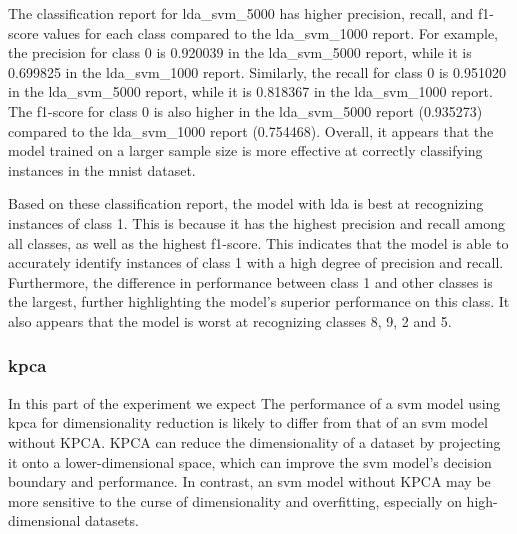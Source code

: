 The classification report for lda_svm_5000 has higher precision, recall, and f1-score values for each class compared to the lda_svm_1000 report. For example, the precision for class 0 is 0.920039 in the lda_svm_5000 report, while it is 0.699825 in the lda_svm_1000 report. Similarly, the recall for class 0 is 0.951020 in the lda_svm_5000 report, while it is 0.818367 in the lda_svm_1000 report. The f1-score for class 0 is also higher in the lda_svm_5000 report (0.935273) compared to the lda_svm_1000 report (0.754468). Overall, it appears that the model trained on a larger sample size is more effective at correctly classifying instances in the \gls{mnist} dataset.

Based on these classification report, the model with \gls{lda} is best at recognizing instances of class 1. This is because it has the highest precision and recall among all classes, as well as the highest f1-score. This indicates that the model is able to accurately identify instances of class 1 with a high degree of precision and recall. Furthermore, the difference in performance between class 1 and other classes is the largest, further highlighting the model's superior performance on this class. It also appears that the model is worst at recognizing classes 8, 9, 2 and 5.

\subsubsection{\gls{kpca}}\label{subsubsec:experiment_4_kernel_pca}
In this part of the experiment we expect The performance of a \gls{svm} model using  \gls{kpca} for dimensionality reduction is likely to differ from that of an \gls{svm} model without KPCA. KPCA can reduce the dimensionality of a dataset by projecting it onto a lower-dimensional space, which can improve the \gls{svm} model's decision boundary and performance. In contrast, an \gls{svm} model without KPCA may be more sensitive to the curse of dimensionality and overfitting, especially on high-dimensional datasets. 

